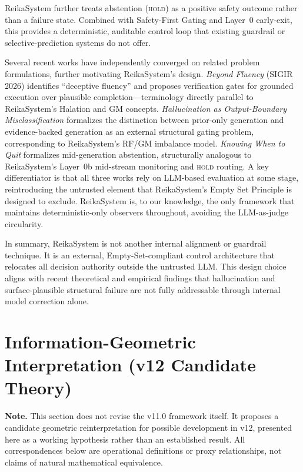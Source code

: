 \documentclass[11pt,a4paper]{article}
\begin{document}
ReikaSystem further treats abstention (\textsc{hold}) as a positive safety outcome
rather than a failure state. Combined with Safety-First Gating and Layer~0 early-exit,
this provides a deterministic, auditable control loop that existing guardrail or
selective-prediction systems do not offer.

Several recent works have independently converged on related problem formulations,
further motivating ReikaSystem's design.
\textit{Beyond Fluency} (SIGIR 2026) identifies ``deceptive fluency'' and proposes
verification gates for grounded execution over plausible completion---terminology
directly parallel to ReikaSystem's Halation and GM concepts.
\textit{Hallucination as Output-Boundary Misclassification} formalizes the distinction
between prior-only generation and evidence-backed generation as an external structural
gating problem, corresponding to ReikaSystem's RF/GM imbalance model.
\textit{Knowing When to Quit} formalizes mid-generation abstention, structurally
analogous to ReikaSystem's Layer~0b mid-stream monitoring and \textsc{hold} routing.
A key differentiator is that all three works rely on LLM-based evaluation at some stage,
reintroducing the untrusted element that ReikaSystem's Empty Set Principle is designed
to exclude. ReikaSystem is, to our knowledge, the only framework that maintains
deterministic-only observers throughout, avoiding the LLM-as-judge circularity.

In summary, ReikaSystem is not another internal alignment or guardrail technique.
It is an external, Empty-Set-compliant control architecture that relocates all decision
authority outside the untrusted LLM. This design choice aligns with recent theoretical
and empirical findings that hallucination and surface-plausible structural failure are
not fully addressable through internal model correction alone.

\section{Information-Geometric Interpretation (v12 Candidate Theory)}
\label{sec:infogeo}

\textbf{Note.}
This section does not revise the v11.0 framework itself.
It proposes a candidate geometric reinterpretation for possible development in v12,
presented here as a working hypothesis rather than an established result.
All correspondences below are operational definitions or proxy relationships,
not claims of natural mathematical equivalence.
\end{document}
